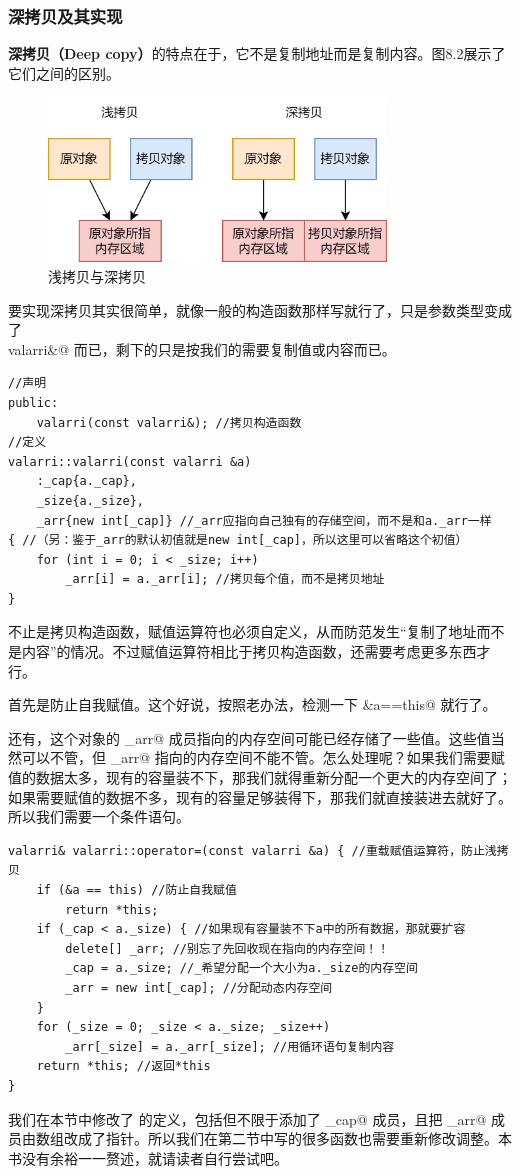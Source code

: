 \subsubsection*{深拷贝及其实现}
\textbf{深拷贝（Deep copy）}的特点在于，它不是复制地址而是复制内容。图8.2展示了它们之间的区别。
\begin{figure}[htbp]
    \centering
    \includegraphics[width=0.8\textwidth]{../images/generalized_parts/08_shallow_copy_and_deep_copy.drawio.png}
    \caption{浅拷贝与深拷贝}
\end{figure}\par
要实现深拷贝其实很简单，就像一般的构造函数那样写就行了，只是参数类型变成了\\\lstinline@const valarri&@ 而已，剩下的只是按我们的需要复制值或内容而已。
\begin{lstlisting}
//声明
public:
    valarri(const valarri&); //拷贝构造函数
//定义
valarri::valarri(const valarri &a)
    :_cap{a._cap},
    _size{a._size},
    _arr{new int[_cap]} //_arr应指向自己独有的存储空间，而不是和a._arr一样
{ //（另：鉴于_arr的默认初值就是new int[_cap]，所以这里可以省略这个初值）
    for (int i = 0; i < _size; i++)
        _arr[i] = a._arr[i]; //拷贝每个值，而不是拷贝地址
}
\end{lstlisting}\par
不止是拷贝构造函数，赋值运算符也必须自定义，从而防范发生``复制了地址而不是内容''的情况。不过赋值运算符相比于拷贝构造函数，还需要考虑更多东西才行。\par
首先是防止自我赋值。这个好说，按照老办法，检测一下 \lstinline@&a==this@ 就行了。\par
还有，这个对象的 \lstinline@_arr@ 成员指向的内存空间可能已经存储了一些值。这些值当然可以不管，但 \lstinline@_arr@ 指向的内存空间不能不管。怎么处理呢？如果我们需要赋值的数据太多，现有的容量装不下，那我们就得重新分配一个更大的内存空间了；如果需要赋值的数据不多，现有的容量足够装得下，那我们就直接装进去就好了。所以我们需要一个条件语句。\par
\begin{lstlisting}
valarri& valarri::operator=(const valarri &a) { //重载赋值运算符，防止浅拷贝
    if (&a == this) //防止自我赋值
        return *this;
    if (_cap < a._size) { //如果现有容量装不下a中的所有数据，那就要扩容
        delete[] _arr; //别忘了先回收现在指向的内存空间！！
        _cap = a._size; //_希望分配一个大小为a._size的内存空间
        _arr = new int[_cap]; //分配动态内存空间
    }
    for (_size = 0; _size < a._size; _size++)
        _arr[_size] = a._arr[_size]; //用循环语句复制内容
    return *this; //返回*this
}
\end{lstlisting}\par
我们在本节中修改了 \lstinline@valarri@ 的定义，包括但不限于添加了 \lstinline@_cap@ 成员，且把 \lstinline@_arr@ 成员由数组改成了指针。所以我们在第二节中写的很多函数也需要重新修改调整。本书没有余裕一一赘述，就请读者自行尝试吧。\par
